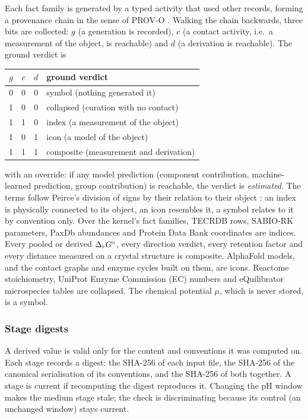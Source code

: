 Each fact family is generated by a typed activity that used other records, forming a provenance chain in the sense of PROV-O \citep{lebo2013provo}.
Walking the chain backwards, three bits are collected: $g$ (a generation is recorded), $c$ (a contact activity, i.e.\ a measurement of the object, is reachable) and $d$ (a derivation is reachable).
The ground verdict is
\begin{center}
\begin{tabular}{@{}cccl@{}}
\toprule
$g$ & $c$ & $d$ & ground verdict \\
\midrule
0 & 0 & 0 & symbol (nothing generated it) \\
1 & 0 & 0 & collapsed (curation with no contact) \\
1 & 1 & 0 & index (a measurement of the object) \\
1 & 0 & 1 & icon (a model of the object) \\
1 & 1 & 1 & composite (measurement and derivation) \\
\bottomrule
\end{tabular}
\end{center}
with an override: if any model prediction (component contribution, machine-learned prediction, group contribution) is reachable, the verdict is \emph{estimated}.
The terms follow Peirce's division of signs by their relation to their object \citep{peirce1932collected}: an index is physically connected to its object, an icon resembles it, a symbol relates to it by convention only.
Over the kernel's fact families, TECRDB rows, SABIO-RK parameters, PaxDb abundances and Protein Data Bank coordinates are indices.
Every pooled or derived $\Delta_r G^\circ$, every direction verdict, every retention factor and every distance measured on a crystal structure is composite.
AlphaFold models, and the contact graphs and enzyme cycles built on them, are icons.
Reactome stoichiometry, UniProt Enzyme Commission (EC) numbers and eQuilibrator microspecies tables are collapsed.
The chemical potential $\mu$, which is never stored, is a symbol.

\subsubsection{Stage digests}
\label{sec:digests}

A derived value is valid only for the content and conventions it was computed on.
Each stage records a digest: the SHA-256 of each input file, the SHA-256 of the canonical serialisation of its conventions, and the SHA-256 of both together.
A stage is current if recomputing the digest reproduces it.
Changing the pH window makes the medium stage stale; the check is discriminating because its control (an unchanged window) stays current.

